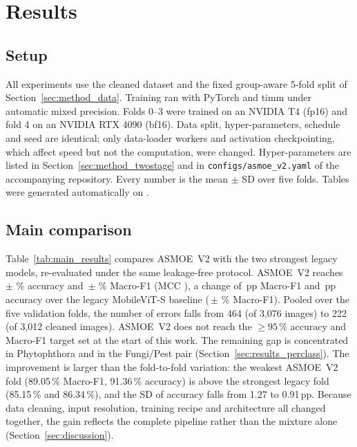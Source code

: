 \section{Results}
\label{sec:results}

\subsection{Setup}
All experiments use the cleaned dataset and the fixed group-aware 5-fold split of
Section~\ref{sec:method_data}. Training ran with PyTorch and timm under
automatic mixed precision. Folds 0--3 were trained on an NVIDIA T4 (fp16) and
fold 4 on an NVIDIA RTX 4090 (bf16). Data split, hyper-parameters, schedule and
seed are identical; only data-loader workers and activation checkpointing,
which affect speed but not the computation, were changed. Hyper-parameters are listed in
Section~\ref{sec:method_twostage} and in \texttt{configs/asmoe\_v2.yaml} of the
accompanying repository. Every number is the mean $\pm$ SD over five folds.
Tables were generated automatically on \ReportGenerated.

\subsection{Main comparison}
\label{sec:results_main}



Table~\ref{tab:main_results} compares ASMOE~V2 with the two strongest legacy
models, re-evaluated under the same leakage-free protocol.
ASMOE~V2 reaches \VtwoAcc\,$\pm$\,\VtwoAccSD\,\% accuracy and
\VtwoFOne\,$\pm$\,\VtwoFOneSD\,\% Macro-F1 (MCC \VtwoMCC), a change of
\DeltaFOne\,pp Macro-F1 and \DeltaAcc\,pp accuracy over the legacy MobileViT-S
baseline (\BaseFOne\,$\pm$\,\BaseFOneSD\,\% Macro-F1). Pooled over the five
validation folds, the number of errors falls from 464 (of 3{,}076 images) to
222 (of 3{,}012 cleaned images). ASMOE~V2 does not reach the
$\geq95\,\%$ accuracy and Macro-F1 target set at the start of this work. The
remaining gap is concentrated in Phytophthora and in the Fungi/Pest pair
(Section~\ref{sec:results_perclass}). The improvement is larger than the
fold-to-fold variation: the weakest ASMOE~V2 fold (89.05\,\% Macro-F1, 91.36\,\%
accuracy) is above the strongest legacy fold (85.15\,\% and 86.34\,\%), and the
SD of accuracy falls from 1.27 to 0.91\,pp. Because data cleaning,
input resolution, training recipe and architecture all changed together, the gain
reflects the complete pipeline rather than the mixture alone
(Section~\ref{sec:discussion}).

